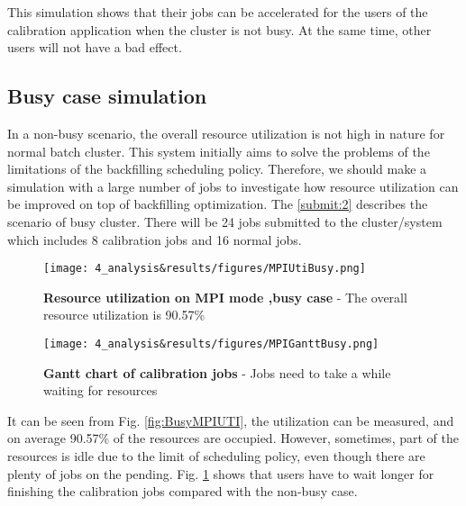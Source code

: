 This simulation shows that their jobs can be accelerated for the users of the calibration application when the cluster is not busy.
At the same time, other users will not have a bad effect.

\subsection{Busy case simulation}

In a non-busy scenario, the overall resource utilization is not high in nature for normal batch cluster.
This system initially aims to solve the problems of the limitations of the backfilling scheduling policy.
Therefore, we should make a simulation with a large number of jobs to investigate how resource utilization can be improved on top of backfilling optimization. 
The \ref{submit:2} describes the scenario of busy cluster. There will be 24 jobs submitted to the cluster/system which includes 8 calibration jobs and 16 normal jobs.
\begin{figure}
    \centering
    \begin{minipage}{.48\textwidth}
      \centering
      \texttt{[image: 4\_analysis\&results/figures/MPIUtiBusy.png]}
      \caption[Resource utilization on MPI mode ,busy case]{{\small\textbf{Resource utilization on MPI mode ,busy case} - The overall resource utilization is 90.57\%}}
      \label{fig:BusyMPIUTI}
    \end{minipage} 
    \begin{minipage}{.48\textwidth}
      \centering
      \texttt{[image: 4\_analysis\&results/figures/MPIGanttBusy.png]}
      \caption[Gantt chart of calibration jobs]{{\small\textbf{Gantt chart of calibration jobs} - Jobs need to take a while waiting for resources}}
      \label{fig:BusyMPIgantt}
    \end{minipage}
\end{figure}
It can be seen from Fig. \ref{fig:BusyMPIUTI}, the utilization can be measured, and on average 90.57\% of the resources are occupied.
However, sometimes, part of the resources is idle due to the limit of scheduling policy, even though there are plenty of jobs on the pending.
Fig. \ref{fig:BusyMPIgantt} shows that users have to wait longer for finishing the calibration jobs compared with the non-busy case.




